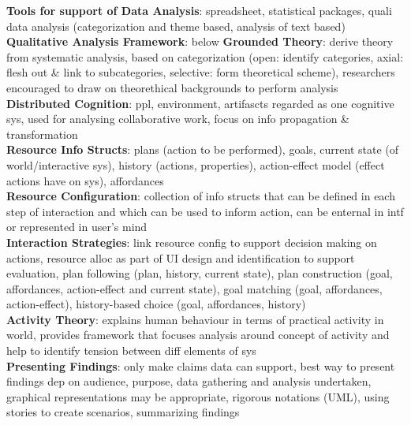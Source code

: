 \documentclass[a4paper]{article}
\begin{document}
\begin{multicols}{3}
        \textbf{Tools for support of Data Analysis}: spreadsheet, statistical packages, quali data analysis (categorization and theme based, analysis of text based)\\
        \textbf{Qualitative Analysis Framework}: below
        \textbf{Grounded Theory}: derive theory from systematic analysis, based on categorization (open: identify categories, axial: flesh out \& link to subcategories, selective: form theoretical scheme), researchers encouraged to draw on theorethical backgrounds to perform analysis\\
        \textbf{Distributed Cognition}: ppl, environment, artifascts regarded as one cognitive sys, used for analysing collaborative work, focus on info propagation \& transformation\\
        \textbf{Resource Info Structs}: plans (action to be performed), goals, current state (of world/interactive sys), history (actions, properties), action-effect model (effect actions have on sys), affordances\\
        \textbf{Resource Configuration}: collection of info structs that can be defined in each step of interaction and which can be used to inform action, can be enternal in intf or represented in user's mind\\
        \textbf{Interaction Strategies}: link resource config to support decision making on actions, resource alloc as part of UI design and identification to support evaluation, plan following (plan, history, current state), plan construction (goal, affordances, action-effect and current state), goal matching (goal, affordances, action-effect), history-based choice (goal, affordances, history)\\
        \textbf{Activity Theory}: explains human behaviour in terms of practical activity in world, provides framework that focuses analysis around concept of activity and help to identify tension between diff elements of sys\\
        \textbf{Presenting Findings}: only make claims data can support, best way to present findings dep on audience, purpose, data gathering and analysis undertaken, graphical representations may be appropriate, rigorous notations (UML), using stories to create scenarios, summarizing findings\\
    \end{multicols}
    
\end{document}
